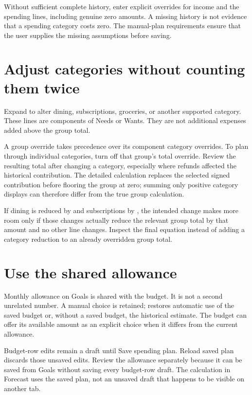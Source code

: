 Without sufficient complete history, enter explicit overrides for income and the spending lines, including genuine zero amounts. A missing history is not evidence that a spending category costs zero. The manual-plan requirements ensure that the user supplies the missing assumptions before saving.

\section{Adjust categories without counting them twice}
Expand  to alter dining, subscriptions, groceries, or another supported category. These lines are components of Needs or Wants. They are not additional expenses added above the group total.

A group override takes precedence over its component category overrides. To plan through individual categories, turn off that group's total override. Review the resulting total after changing a category, especially where refunds affected the historical contribution. The detailed calculation replaces the selected signed contribution before flooring the group at zero; summing only positive category displays can therefore differ from the true group calculation.

If dining is reduced by  and subscriptions by , the intended change makes  more room only if those changes actually reduce the relevant group total by that amount and no other line changes. Inspect the final equation instead of adding a category reduction to an already overridden group total.

\section{Use the shared allowance}
Monthly allowance on Goals is shared with the budget. It is not a second unrelated number. A manual choice is retained;  restores automatic use of the saved budget or, without a saved budget, the historical estimate. The budget can offer its available amount as an explicit choice when it differs from the current allowance.

Budget-row edits remain a draft until Save spending plan. Reload saved plan discards those unsaved edits. Review the allowance separately because it can be saved from Goals without saving every budget-row draft. The calculation in Forecast uses the saved plan, not an unsaved draft that happens to be visible on another tab.

